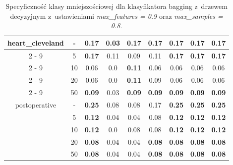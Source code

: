 \begin{table}[H]
\begin{center}
{\begin{tabular}{c|c|ccccccc}
				\hline%
				\multirow{5}{*}{heart\_cleveland}&{-}&\textbf{0.17}&0.03&\textbf{0.17}&\textbf{0.17}&\textbf{0.17}&\textbf{0.17}&\textbf{0.17}\\%
				\cline{2%
					-%
					9}%
				&5&\textbf{0.17}&0.11&0.09&0.11&\textbf{0.17}&\textbf{0.17}&\textbf{0.17}\\%
				\cline{2%
					-%
					9}%
				&10&0.06&0.0&\textbf{0.11}&0.06&0.06&0.06&0.06\\%
				\cline{2%
					-%
					9}%
				&20&0.06&0.0&\textbf{0.11}&0.09&0.06&0.06&0.06\\%
				\cline{2%
					-%
					9}%
				&50&\textbf{0.09}&0.03&\textbf{0.09}&\textbf{0.09}&\textbf{0.09}&\textbf{0.09}&\textbf{0.09}\\%
				\hline%
				\multirow{5}{*}{postoperative}&{-}&\textbf{0.25}&0.08&0.08&0.17&\textbf{0.25}&\textbf{0.25}&\textbf{0.25}\\%
				\cline{2%
					-%
					9}%
				&5&\textbf{0.12}&0.04&0.04&0.08&\textbf{0.12}&\textbf{0.12}&\textbf{0.12}\\%
				\cline{2%
					-%
					9}%
				&10&\textbf{0.12}&0.0&0.08&0.08&\textbf{0.12}&\textbf{0.12}&\textbf{0.12}\\%
				\cline{2%
					-%
					9}%
				&20&\textbf{0.08}&0.04&0.04&\textbf{0.08}&\textbf{0.08}&\textbf{0.08}&\textbf{0.08}\\%
				\cline{2%
					-%
					9}%
				&50&\textbf{0.08}&0.04&0.04&\textbf{0.08}&\textbf{0.08}&\textbf{0.08}&\textbf{0.08}\\%
				\hline%
			\end{tabular}
			}
			\caption{Specyficzność klasy mniejszościowej dla klasyfikatora bagging z~drzewem decyzyjnym z~ustawieniami \textit{max\_features = 0.9} oraz \textit{max\_samples = 0.8}.}
			\label{baggingdrzewo2spec2}
		\end{center}
	\end{table}

	
